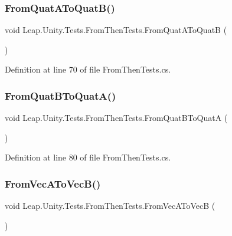 \subsubsection{\texorpdfstring{FromQuatAToQuatB()}{FromQuatAToQuatB()}}
{\footnotesize\ttfamily void Leap.\+Unity.\+Tests.\+From\+Then\+Tests.\+From\+Quat\+A\+To\+QuatB (\begin{DoxyParamCaption}{ }\end{DoxyParamCaption})}



Definition at line 70 of file From\+Then\+Tests.\+cs.

\mbox{\label{class_leap_1_1_unity_1_1_tests_1_1_from_then_tests_a341af363c80bd833e3f3db5f65e3eb6d}} 
\subsubsection{\texorpdfstring{FromQuatBToQuatA()}{FromQuatBToQuatA()}}
{\footnotesize\ttfamily void Leap.\+Unity.\+Tests.\+From\+Then\+Tests.\+From\+Quat\+B\+To\+QuatA (\begin{DoxyParamCaption}{ }\end{DoxyParamCaption})}



Definition at line 80 of file From\+Then\+Tests.\+cs.

\mbox{\label{class_leap_1_1_unity_1_1_tests_1_1_from_then_tests_a7cdf13e129d1e3721a6d66047162a040}} 
\subsubsection{\texorpdfstring{FromVecAToVecB()}{FromVecAToVecB()}}
{\footnotesize\ttfamily void Leap.\+Unity.\+Tests.\+From\+Then\+Tests.\+From\+Vec\+A\+To\+VecB (\begin{DoxyParamCaption}{ }\end{DoxyParamCaption})}




